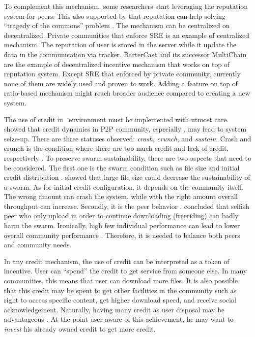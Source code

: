 To complement this mechanism, some researchers start leveraging the reputation system for peers. This also supported by \citeauthor{2002:reputationtotragedy:milinski} that reputation can help solving ``tragedy of the commons'' problem \cite{2002:reputationtotragedy:milinski}. The mechanism can be centralized on decentralized. Private communities that enforce SRE is an example of centralized mechanism. The reputation of user is stored in the server while it update the data in the communication via tracker. BarterCast \cite{2009:bartercast:meulpolder} and its successor MultiChain \cite{2015:multichain:norberhuis} are the example of decentralized incentive mechanism that works on top of reputation system. Except SRE that enforced by private community, currently none of them are widely used and proven to work. Adding a feature on top of ratio-based mechanism might reach broader audience compared to creating a new system.

The use of credit in \bt~environment must be implemented with utmost care. \citeauthor{2010:crashsustain:rahman} showed that credit dynamics in P2P community, especially \bt, may lead to system seize-up. There are three statuses observed: \textit{crash}, \textit{crunch}, and \textit{sustain}. Crash and crunch is the condition where there are too much credit and lack of credit, respectively \cite{2010:crashsustain:rahman, 2015:sustainabilitypt:vinko}. To preserve swarm sustainability, there are two aspects that need to be considered. The first one is the swarm condition such as file size and initial credit distribution \cite{2015:sustainabilitypt:vinko}. \citeauthor{2015:sustainabilitypt:vinko} showed that large file size could decrease the sustainability of a swarm. As for initial credit configuration, it depends on the community itself. The wrong amount can crash the system, while with the right amount overall throughput can increase. Secondly, it is the peer behavior \cite{2010:crashsustain:rahman}. \citeauthor{2010:crashsustain:rahman} concluded that selfish peer who only upload in order to continue downloading (freeriding) can badly harm the swarm. Ironically, high few individual performance can lead to lower overall community performance \cite{2015:sustainabilitypt:vinko}. Therefore, it is needed to balance both peers and community needs.

In any credit mechanism, the use of credit can be interpreted as a token of incentive. User can ``spend'' the credit to get service from someone else. In many communities, this means that user can download more files. It is also possible that this credit may be spent to get other facilities in the community such as right to access specific content, get higher download speed, and receive social acknowledgement. Naturally, having many credit as user disposal may be advantageous \cite{2014:sustainabilitytorrent:chen}. At the point user aware of this achievement, he may want to \textit{invest} his already owned credit to get more credit. 

